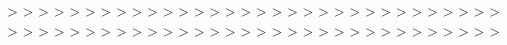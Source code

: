 \documentclass{article}%
\begin{document}
>\newline%
>\newline%
>\newline%
>\newline%
>\newline%
>\newline%
>\newline%
>\newline%
>\newline%
>\newline%
>\newline%
>\newline%
>\newline%
>\newline%
>\newline%
>\newline%
>\newline%
>\newline%
>\newline%
>\newline%
>\newline%
>\newline%
>\newline%
>\newline%
>\newline%
>\newline%
>\newline%
>\newline%
>\newline%
>\newline%
>\newline%
>\newline%
>\newline%
>\newline%
>\newline%
>\newline%
>\newline%
>\newline%
>\newline%
>\newline%
>\newline%
>\newline%
>\newline%
>\newline%
>\newline%
>\newline%
>\newline%
>\newline%
>\newline%
>\newline%
>\newline%
>\newline%
>\newline%
>\newline%
>\newline%
>\newline%
>\newline%
>\newline%
>\newline%
>\newline%
>\newline%
>\newline%
>\newline%
>
\end{document}
